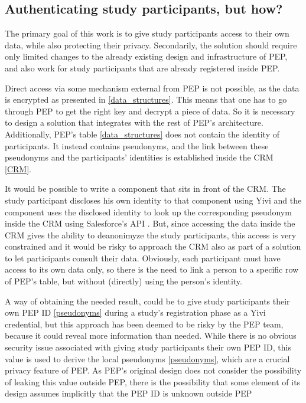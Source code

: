 \documentclass{report}
\begin{document}
\subsection{Authenticating study participants, but how?}\label{authenticationg_but_how} 
The primary goal of this work is to give study participants access to their own data, while also protecting their privacy. Secondarily, the solution should require only limited
changes to the already existing design and infrastructure of PEP, and also work for study participants that are already registered inside PEP.\par Direct access via some mechanism
external from PEP is not possible, as the data is encrypted as presented in \ref{data_structures}. This means that one has to go through PEP to get the right key and decrypt a
piece of data. So it is necessary to design a solution that integrates with the rest of PEP's architecture. Additionally, PEP's table \ref{data_structures} does not contain the
identity of participants. It instead contains pseudonyms, and the link between these pseudonyms and the participants' identities is established inside the CRM \ref{CRM}. \par 
It would be possible to write a component that sits in front of the CRM. The study participant discloses his own identity to that component using Yivi and the component uses the
disclosed identity to look up the corresponding pseudonym inside the CRM using Salesforce's API \cite{salesforce}. But, since accessing the data inside the CRM gives the ability to
deanonimyze the study participants, this access is very constrained and it would be risky to approach the CRM also as part of a solution to let participants consult their data.
Obviously, each participant must have access to its own data only, so there is the need to link a person to a specific row of PEP's table, but without (directly) using the person's
identity. \par 
A way of obtaining the needed result, could be to give study participants their own PEP ID \ref{pseudonyms} during a study's registration phase as a Yivi credential, but this
approach has been deemed to be risky by the PEP team, because it could reveal more information than needed. While there is no obvious security issue associated with giving study
participants their own PEP ID, this value is used to derive the local pseudonyms \ref{pseudonyms}, which are a crucial privacy feature of PEP. As PEP's original design does not
consider the possibility of leaking this value outside PEP, there is the possibility that some element of its design assumes implicitly that the PEP ID is unknown outside PEP
\end{document}
